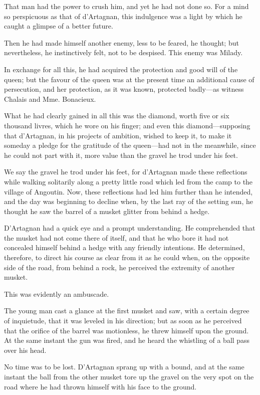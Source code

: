That man had the power to crush him, and yet he had not done so. For a mind so perspicuous as that of d'Artagnan, this indulgence was a light by which he caught a glimpse of a better future. 

Then he had made himself another enemy, less to be feared, he thought; but nevertheless, he instinctively felt, not to be despised. This enemy was Milady. 

In exchange for all this, he had acquired the protection and good will of the queen; but the favour of the queen was at the present time an additional cause of persecution, and her protection, as it was known, protected badly---as witness Chalais and Mme. Bonacieux. 

What he had clearly gained in all this was the diamond, worth five or six thousand livres, which he wore on his finger; and even this diamond---supposing that d'Artagnan, in his projects of ambition, wished to keep it, to make it someday a pledge for the gratitude of the queen---had not in the meanwhile, since he could not part with it, more value than the gravel he trod under his feet. 

We say the gravel he trod under his feet, for d'Artagnan made these reflections while walking solitarily along a pretty little road which led from the camp to the village of Angoutin. Now, these reflections had led him further than he intended, and the day was beginning to decline when, by the last ray of the setting sun, he thought he saw the barrel of a musket glitter from behind a hedge. 

D'Artagnan had a quick eye and a prompt understanding. He comprehended that the musket had not come there of itself, and that he who bore it had not concealed himself behind a hedge with any friendly intentions. He determined, therefore, to direct his course as clear from it as he could when, on the opposite side of the road, from behind a rock, he perceived the extremity of another musket. 

This was evidently an ambuscade. 

The young man cast a glance at the first musket and saw, with a certain degree of inquietude, that it was leveled in his direction; but as soon as he perceived that the orifice of the barrel was motionless, he threw himself upon the ground. At the same instant the gun was fired, and he heard the whistling of a ball pass over his head. 

No time was to be lost. D'Artagnan sprang up with a bound, and at the same instant the ball from the other musket tore up the gravel on the very spot on the road where he had thrown himself with his face to the ground. 

